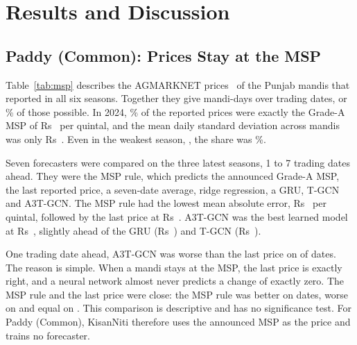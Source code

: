 \section{Results and Discussion}
\label{sec:results}

\subsection{Paddy (Common): Prices Stay at the MSP}
\label{sec:results-msp}

Table~\ref{tab:msp} describes the AGMARKNET prices~\cite{agmarknet} of the  Punjab mandis that reported in all six seasons.
Together they give  mandi-days over  trading dates, or \% of those
possible. In 2024, \% of the reported prices were exactly the Grade-A MSP of Rs~ per quintal, and the
mean daily standard deviation across mandis was only Rs~. Even in the weakest season, , the
share was \%.

\begin{table}[t]
  \centering
  \caption{Paddy (Common) prices from AGMARKNET~\cite{agmarknet} in the  selected Punjab mandis, September to December of each season. SD:
  standard deviation.}
  \label{tab:msp}
  \footnotesize
  
\end{table}

Seven forecasters were compared on the three latest seasons, 1 to 7 trading dates ahead. They were the MSP rule, which predicts the
announced Grade-A MSP, the last reported price, a seven-date average, ridge regression, a GRU, T-GCN and A3T-GCN. The MSP rule had the
lowest mean absolute error, Rs~ per quintal, followed by the last price at Rs~. A3T-GCN was the
best learned model at Rs~, slightly ahead of the GRU (Rs~) and T-GCN (Rs~).

One trading date ahead, A3T-GCN was worse than the last price on  of  dates. The reason is
simple. When a mandi stays at the MSP, the last price is exactly right, and a neural network almost never predicts a change of exactly
zero. The MSP rule and the last price were close: the MSP rule was better on  dates, worse on
 and equal on . This comparison is descriptive and has no significance test. For Paddy
(Common), KisanNiti therefore uses the announced MSP as the price and trains no forecaster.

